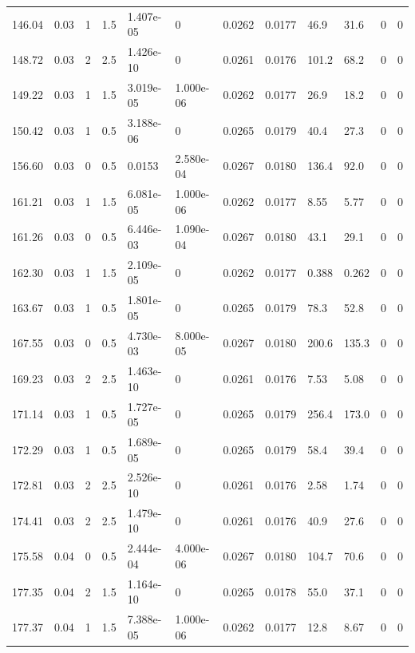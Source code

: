 \documentclass[preview]{standalone}
\begin{document}
{{{\begin{tabular}{L{1.2cm}C{1.2cm} C{0.3cm}C{0.5cm} C{1.4cm}C{1.4cm} C{1.4cm}C{1.4cm} C{1.6cm}C{1.6cm} C{1.6cm}C{1.6cm}}
  146.04  &  0.03  & 1     & 1.5 &  1.407e-05  & 0  &  0.0262&   0.0177& 46.9 & 31.6   &  0 & 0  \\ 
  148.72  &  0.03  & 2     & 2.5 &  1.426e-10  & 0  &  0.0261&   0.0176& 101.2 & 68.2   &  0 & 0  \\ 
  149.22  &  0.03  & 1     & 1.5 &  3.019e-05  & 1.000e-06  &  0.0262&   0.0177& 26.9 & 18.2   &  0 & 0  \\ 
  150.42  &  0.03  & 1     & 0.5 &  3.188e-06  & 0  &  0.0265&   0.0179& 40.4 & 27.3   &  0 & 0  \\ 
  156.60  &  0.03  & 0     & 0.5 &  0.0153  & 2.580e-04  &  0.0267&   0.0180& 136.4 & 92.0   &  0 & 0  \\ 
  161.21  &  0.03  & 1     & 1.5 &  6.081e-05  & 1.000e-06  &  0.0262&   0.0177& 8.55 & 5.77   &  0 & 0  \\ 
  161.26  &  0.03  & 0     & 0.5 &  6.446e-03  & 1.090e-04  &  0.0267&   0.0180& 43.1 & 29.1   &  0 & 0  \\ 
  162.30  &  0.03  & 1     & 1.5 &  2.109e-05  & 0  &  0.0262&   0.0177& 0.388 & 0.262   &  0 & 0  \\ 
  163.67  &  0.03  & 1     & 0.5 &  1.801e-05  & 0  &  0.0265&   0.0179& 78.3 & 52.8   &  0 & 0  \\ 
  167.55  &  0.03  & 0     & 0.5 &  4.730e-03  & 8.000e-05  &  0.0267&   0.0180& 200.6 & 135.3   &  0 & 0  \\ 
  169.23  &  0.03  & 2     & 2.5 &  1.463e-10  & 0  &  0.0261&   0.0176& 7.53 & 5.08   &  0 & 0  \\ 
  171.14  &  0.03  & 1     & 0.5 &  1.727e-05  & 0  &  0.0265&   0.0179& 256.4 & 173.0   &  0 & 0  \\ 
  172.29  &  0.03  & 1     & 0.5 &  1.689e-05  & 0  &  0.0265&   0.0179& 58.4 & 39.4   &  0 & 0  \\ 
  172.81  &  0.03  & 2     & 2.5 &  2.526e-10  & 0  &  0.0261&   0.0176& 2.58 & 1.74   &  0 & 0  \\ 
  174.41  &  0.03  & 2     & 2.5 &  1.479e-10  & 0  &  0.0261&   0.0176& 40.9 & 27.6   &  0 & 0  \\ 
  175.58  &  0.04  & 0     & 0.5 &  2.444e-04  & 4.000e-06  &  0.0267&   0.0180& 104.7 & 70.6   &  0 & 0  \\ 
  177.35  &  0.04  & 2     & 1.5 &  1.164e-10  & 0  &  0.0265&   0.0178& 55.0 & 37.1   &  0 & 0  \\ 
  177.37  &  0.04  & 1     & 1.5 &  7.388e-05  & 1.000e-06  &  0.0262&   0.0177& 12.8 & 8.67   &  0 & 0  \\ 

\end{tabular}}}}
\end{document}
